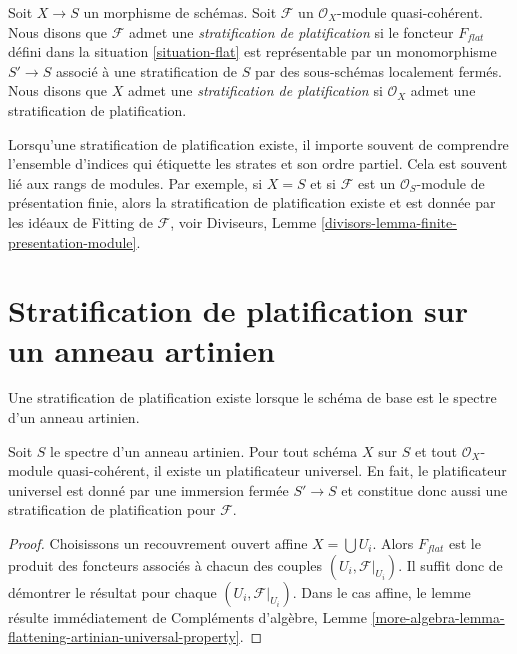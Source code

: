 \begin{definition}
\label{definition-flattening-stratification}
Soit $X \to S$ un morphisme de schémas.
Soit $\mathcal{F}$ un $\mathcal{O}_X$-module quasi-cohérent.
Nous disons que $\mathcal{F}$ admet une {\it stratification de platification}
si le foncteur $F_{flat}$ défini dans la situation \ref{situation-flat}
est représentable par un monomorphisme $S' \to S$ associé
à une stratification de $S$ par des sous-schémas localement fermés.
Nous disons que $X$ admet une {\it stratification de platification}
si $\mathcal{O}_X$ admet une stratification de platification.
\end{definition}

\noindent
Lorsqu'une stratification de platification existe, il importe souvent
de comprendre l'ensemble d'indices qui étiquette les strates et son ordre partiel.
Cela est souvent lié aux rangs de modules. Par exemple, si
$X = S$ et si $\mathcal{F}$ est un $\mathcal{O}_S$-module de présentation finie,
alors la stratification de platification existe et est donnée par les idéaux de Fitting
de $\mathcal{F}$, voir
Diviseurs, Lemme \ref{divisors-lemma-finite-presentation-module}.




\section{Stratification de platification sur un anneau artinien}
\label{section-flattening-artinian}

\noindent
Une stratification de platification existe lorsque le schéma de base est le spectre
d'un anneau artinien.

\begin{lemma}
\label{lemma-flattening-stratification-artinian}
Soit $S$ le spectre d'un anneau artinien.
Pour tout schéma $X$ sur $S$ et tout $\mathcal{O}_X$-module quasi-cohérent,
il existe un platificateur universel. En fait, le platificateur universel
est donné par une immersion fermée $S' \to S$ et constitue donc aussi une
stratification de platification pour $\mathcal{F}$.
\end{lemma}

\begin{proof}
Choisissons un recouvrement ouvert affine $X = \bigcup U_i$.
Alors $F_{flat}$ est le produit des foncteurs associés à
chacun des couples $(U_i, \mathcal{F}|_{U_i})$.
Il suffit donc de démontrer le résultat pour chaque
$(U_i, \mathcal{F}|_{U_i})$.
Dans le cas affine, le lemme résulte immédiatement de
Compléments d'algèbre,
Lemme \ref{more-algebra-lemma-flattening-artinian-universal-property}.
\end{proof}







